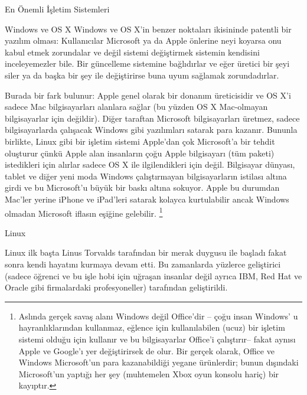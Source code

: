 \begin{section}{En Önemli İşletim Sistemleri}
\begin{subsection}{Windows ve OS X}
Windows ve OS X'in benzer noktaları ikisininde patentli bir yazılım olması: Kullanıcılar Microsoft ya da Apple önlerine neyi koyarsa onu kabul etmek zorundalar ve değil sistemi değiştirmek sistemin kendisini inceleyemezler bile. Bir güncelleme sistemine bağlıdırlar ve eğer üretici bir şeyi siler ya da başka bir şey ile değiştirirse buna uyum sağlamak zorundadırlar.

Burada bir fark bulunur: Apple genel olarak bir donanım üreticisidir ve OS X'i sadece Mac bilgisayarları alanlara sağlar (bu yüzden OS X Mac-olmayan bilgisayarlar için değildir). Diğer taraftan Microsoft bilgisayarları üretmez, sadece bilgisayarlarda çalışacak Windows gibi yazılımları satarak para kazanır. Bununla birlikte, Linux gibi bir işletim sistemi Apple'dan çok Microsoft'a bir tehdit oluşturur çünkü Apple alan insanların çoğu Apple bilgisayarı (tüm paketi) istedikleri için alırlar sadece OS X ile ilgilendikleri için değil. Bilgisayar dünyası, tablet ve diğer yeni moda Windows çalıştırmayan bilgisayarların istilası altına girdi ve bu Microsoft'u büyük bir baskı altına sokuyor. Apple bu durumdan Mac'ler yerine iPhone ve iPad'leri satarak kolayca kurtulabilir ancak Windows olmadan Microsoft iflasın eşiğine gelebilir.
\footnote{Aslında gerçek savaş alanı Windows değil Office'dir – çoğu insan Windows' u hayranlıklarından kullanmaz, eğlence için kullanılabilen (ucuz) bir işletim sistemi olduğu için kullanır ve bu bilgisayarlar Office'i çalıştırır-- fakat aynısı Apple ve Google'ı yer değiştirirsek de olur. Bir gerçek olarak, Office ve Windows Microsoft'un para kazanabildiği yegane ürünlerdir; bunun dışındaki Microsoft'un yaptığı her şey (muhtemelen Xbox oyun konsolu hariç) bir kayıptır.}
\end{subsection}
\begin{subsection}{Linux}

Linux ilk başta Linus Torvalds tarafından bir merak duygusu ile başladı fakat sonra kendi hayatını kurmaya devam etti. Bu zamanlarda yüzlerce geliştirici (sadece öğrenci ve bu işle hobi için uğraşan insanlar değil ayrıca IBM, Red Hat ve Oracle gibi firmalardaki profesyoneller) tarafından geliştirildi.


\end{subsection}
\end{section}

